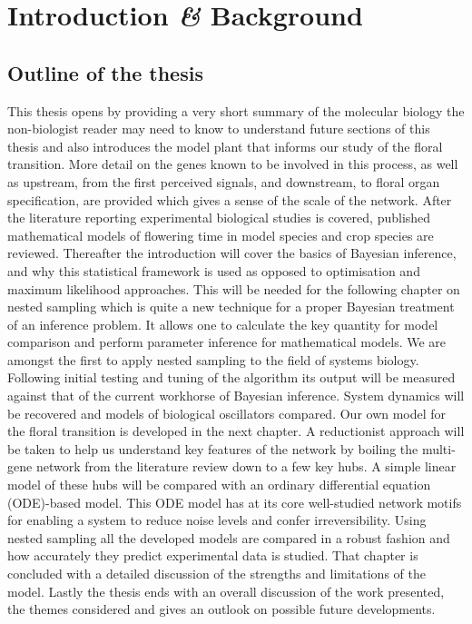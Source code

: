 \chapter{Introduction \emph{\&} Background}%
\thispagestyle{empty}
\label{chapter:intro}

\section{Outline of the thesis}\label{sec:outline}
This thesis opens by providing a very short summary of the molecular biology the non-biologist reader may need to know to understand future sections of this thesis and also introduces the model plant that informs our study of the floral transition.
More detail on the genes known to be involved in this process, as well as upstream, from the first perceived signals, and downstream, to floral organ specification, are provided which gives a sense of the scale of the network.
After the literature reporting experimental biological studies is covered, published mathematical models of flowering time in model species and crop species are reviewed.
Thereafter the introduction will cover the basics of Bayesian inference, and why this statistical framework is used as opposed to optimisation and maximum likelihood approaches.
This will be needed for the following chapter on nested sampling which is quite a new technique for a proper Bayesian treatment of an inference problem.
It allows one to calculate the key quantity for model comparison and perform parameter inference for mathematical models.
We are amongst the first to apply nested sampling to the field of systems biology.
Following initial testing and tuning of the algorithm its output will be measured against that of the current workhorse of Bayesian inference.
System dynamics will be recovered and models of biological oscillators compared.
Our own model for the floral transition is developed in the next chapter.
A reductionist approach will be taken to help us understand key features of the network by boiling the multi-gene network from the literature review down to a few key hubs.
A simple linear model of these hubs will be compared with an ordinary differential equation (ODE)-based model.
This ODE model has at its core well-studied network motifs for enabling a system to reduce noise levels and confer irreversibility. 
Using nested sampling all the developed models are compared in a robust fashion and how accurately they predict experimental data is studied.
That chapter is concluded with a detailed discussion of the strengths and limitations of the model.
Lastly the thesis ends with an overall discussion of the work presented, the themes considered and gives an outlook on possible future developments.

